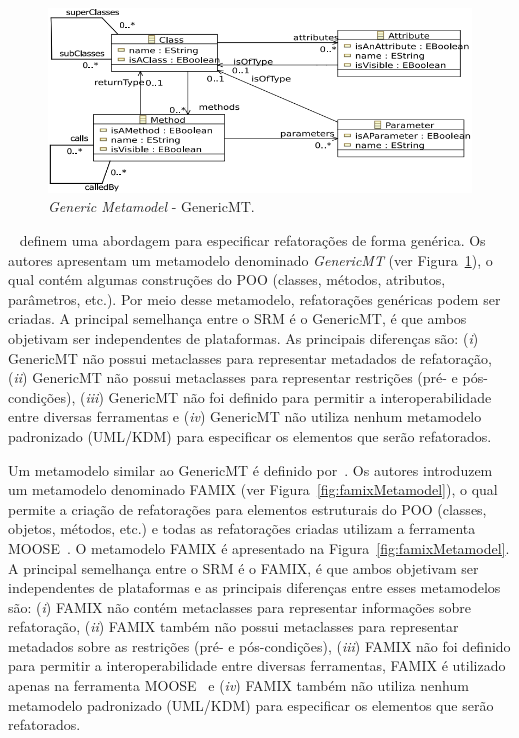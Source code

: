 \begin{figure}[h]
	\centering
	\caption{\textit{Generic Metamodel} - GenericMT.}
	\label{fig:genericMt}
	\includegraphics[scale=0.45]{images/GenericMT}
\end{figure}

~ definem uma abordagem para especificar refatorações de forma genérica. Os autores apresentam um metamodelo denominado \textit{GenericMT} (ver Figura~\ref{fig:genericMt}), o qual contém algumas construções do POO (classes, métodos, atributos, parâmetros, etc.). Por meio desse metamodelo, refatorações genéricas podem ser criadas. A principal semelhança entre o SRM é o GenericMT, é que ambos objetivam ser independentes de plataformas. As principais diferenças são: (\textit{i}) GenericMT não possui metaclasses para representar metadados de refatoração, (\textit{ii}) GenericMT não possui metaclasses para representar restrições (pré- e pós-condições),  (\textit{iii}) GenericMT não foi definido para permitir a interoperabilidade entre diversas ferramentas e (\textit{iv}) GenericMT não utiliza nenhum metamodelo padronizado (UML/KDM) para especificar os elementos que serão refatorados.


Um metamodelo similar ao GenericMT é definido por~. Os autores introduzem um metamodelo denominado FAMIX (ver Figura~\ref{fig:famixMetamodel}), o qual permite a criação de refatorações para elementos estruturais do POO (classes, objetos, métodos, etc.) e todas as refatorações criadas utilizam a ferramenta MOOSE~\cite{ducasse2005moose}. O metamodelo FAMIX é apresentado na Figura~\ref{fig:famixMetamodel}. A principal semelhança entre o SRM é o FAMIX, é que ambos objetivam ser independentes de plataformas e as principais diferenças entre esses metamodelos são: (\textit{i}) FAMIX não contém metaclasses para representar informações sobre refatoração, (\textit{ii}) FAMIX também não possui metaclasses para representar metadados sobre as restrições (pré- e pós-condições),  (\textit{iii}) FAMIX não foi definido para permitir a interoperabilidade entre diversas ferramentas, FAMIX é utilizado apenas na ferramenta MOOSE~\cite{ducasse2005moose} e (\textit{iv}) FAMIX também não utiliza nenhum metamodelo padronizado (UML/KDM) para especificar os elementos que serão refatorados.

